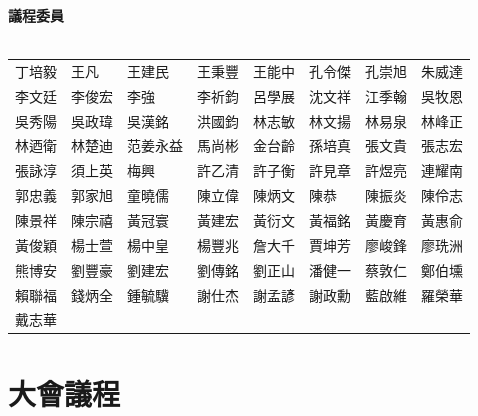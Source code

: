 \documentclass[12pt,oneside,a4paper]{book}
\begin{document}
\textbf{議程委員} \\ \\
\begin{tabular}{p{1.8cm}p{1.8cm}p{1.8cm}p{1.8cm}p{1.8cm}p{1.8cm}p{1.8cm}p{1.8cm}}
丁培毅  &  王凡  &  王建民 & 王秉豐 & 王能中 & 孔令傑&  孔崇旭 & 朱威達 \\
李文廷 & 李俊宏 &李強&  李祈鈞 &   呂學展  &  沈文祥 &   江季翰 &   吳牧恩 \\
吳秀陽 & 吳政瑋  &  吳漢銘 & 洪國鈞 & 林志敏    &林文揚 &林易泉 &林峰正 \\   
林迺衛 &林楚迪  &范姜永益 &馬尚彬 &金台齡& 孫培真& 張文貴&  張志宏    \\
張詠淳& 須上英& 梅興& 許乙清&    許子衡& 許見章 &   許煜亮& 連耀南 \\
郭忠義& 郭家旭& 童曉儒& 陳立偉&    陳炳文&    陳恭& 陳振炎&  陳伶志 \\
陳景祥& 陳宗禧& 黃冠寰& 黃建宏&    黃衍文&    黃福銘&  黃慶育&    黃惠俞\\    
黃俊穎&  楊士萱& 楊中皇& 楊豐兆&   詹大千&    賈坤芳&  廖峻鋒& 廖珗洲 \\   
熊博安& 劉豐豪& 劉建宏&  劉傳銘&    劉正山&    潘健一& 蔡敦仁& 鄭伯壎   \\ 
賴聯福& 錢炳全& 鍾毓驥&  謝仕杰&    謝孟諺&     謝政勳&    藍啟維& 羅榮華 \\
戴志華   
\end{tabular} 

\chapter*{大會議程} 
\end{document}
